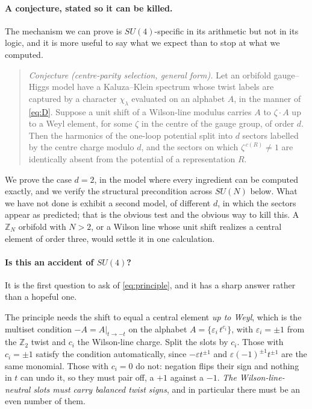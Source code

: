 \documentclass[11pt,a4paper]{article}
\newcommand{\ZZ}{\mathbb{Z}}
\begin{document}
\paragraph{A conjecture, stated so it can be killed.} The mechanism we can prove is
$SU(4)$-specific in its arithmetic but not in its logic, and it is more useful to say what we
expect than to stop at what we computed.

\begin{quote}
\emph{Conjecture (centre-parity selection, general form).} Let an orbifold gauge--Higgs model
have a Kaluza--Klein spectrum whose twist labels are captured by a character
$\chi_\lambda$ evaluated on an alphabet $A$, in the manner of \eqref{eq:D}. Suppose a unit
shift of a Wilson-line modulus carries $A$ to $\zeta\cdot A$ up to a Weyl element, for some
$\zeta$ in the centre of the gauge group, of order $d$. Then the harmonics of the one-loop
potential split into $d$ sectors labelled by the centre charge modulo $d$, and the sectors
on which $\zeta^{\,c(R)}\neq1$ are identically absent from the potential of a representation
$R$.
\end{quote}

We prove the case $d=2$, in the model where every ingredient can be computed exactly, and we
verify the structural precondition across $SU(N)$ below. What we have not done is exhibit a
second model, of different $d$, in which the sectors appear as predicted; that is the obvious
test and the obvious way to kill this. A $\ZZ_N$ orbifold with $N>2$, or a Wilson line whose
unit shift realizes a central element of order three, would settle it in one calculation.

\paragraph{Is this an accident of $SU(4)$?} It is the first question to ask of
\eqref{eq:principle}, and it has a sharp answer rather than a hopeful one.

The principle needs the shift to equal a central element \emph{up to Weyl}, which is the
multiset condition $-A=A|_{t\to-t}$ on the alphabet $A=\{\varepsilon_i\,t^{c_i}\}$, with
$\varepsilon_i=\pm1$ from the $\ZZ_2$ twist and $c_i$ the Wilson-line charge. Split the slots
by $c_i$. Those with $c_i=\pm1$ satisfy the condition automatically, since
$-\varepsilon t^{\pm1}$ and $\varepsilon(-1)^{\pm1}t^{\pm1}$ are the same monomial. Those
with $c_i=0$ do not: negation flips their sign and nothing in $t$ can undo it, so they must
pair off, a $+1$ against a $-1$. \emph{The Wilson-line-neutral slots must carry balanced
twist signs}, and in particular there must be an even number of them.
\end{document}
